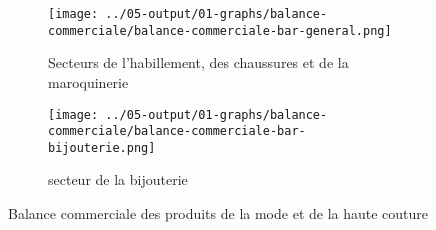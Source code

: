 \documentclass[french,10pt,a4paper]{article}
\begin{document}
\begin{figure}[!h]
  \centering
  \begin{subfigure}{\textwidth}
    \centering     \texttt{[image: ../05-output/01-graphs/balance-commerciale/balance-commerciale-bar-general.png]}
    \caption{Secteurs de l'habillement, des chaussures et de la maroquinerie}
    \label{fig:balance-commerciale-bar-general}
  \end{subfigure}
  \vspace{0.5cm}
  \begin{subfigure}{\textwidth}
    \centering \texttt{[image: ../05-output/01-graphs/balance-commerciale/balance-commerciale-bar-bijouterie.png]}
 \caption{secteur de la bijouterie}
 \label{fig:balance-commerciale-bar-bijouterie}
  \end{subfigure}
  \caption{Balance commerciale des produits de la mode et de la haute couture}
  \label{fig:balance-commerciale}
\end{figure}








\end{document}
